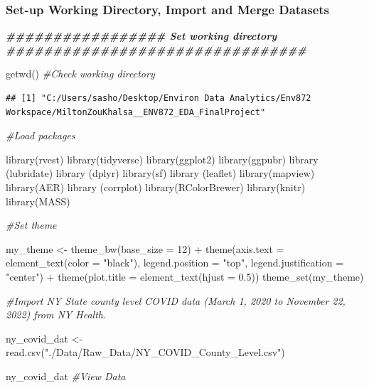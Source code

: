 \documentclass[
  12pt,
]{article}
\newenvironment{Shaded}{\begin{snugshade}}{\end{snugshade}}
\newcommand{\AttributeTok}[1]{\textcolor[rgb]{0.77,0.63,0.00}{#1}}
\newcommand{\CommentTok}[1]{\textcolor[rgb]{0.56,0.35,0.01}{\textit{#1}}}
\newcommand{\DecValTok}[1]{\textcolor[rgb]{0.00,0.00,0.81}{#1}}
\newcommand{\DocumentationTok}[1]{\textcolor[rgb]{0.56,0.35,0.01}{\textbf{\textit{#1}}}}
\newcommand{\FloatTok}[1]{\textcolor[rgb]{0.00,0.00,0.81}{#1}}
\newcommand{\FunctionTok}[1]{\textcolor[rgb]{0.00,0.00,0.00}{#1}}
\newcommand{\NormalTok}[1]{#1}
\newcommand{\OtherTok}[1]{\textcolor[rgb]{0.56,0.35,0.01}{#1}}
\newcommand{\SpecialCharTok}[1]{\textcolor[rgb]{0.00,0.00,0.00}{#1}}
\newcommand{\StringTok}[1]{\textcolor[rgb]{0.31,0.60,0.02}{#1}}
\begin{document}
\hypertarget{set-up-working-directory-import-and-merge-datasets}{%
\subsubsection{Set-up Working Directory, Import and Merge
Datasets}\label{set-up-working-directory-import-and-merge-datasets}}

\begin{Shaded}
\begin{Highlighting}[]
\DocumentationTok{\#\#\#\#\#\#\#\#\#\#\#\#\#\#\#\#\# Set working directory \#\#\#\#\#\#\#\#\#\#\#\#\#\#\#\#\#\#\#\#\#\#\#\#\#\#\#\#\#\#\#\#}

\FunctionTok{getwd}\NormalTok{() }\CommentTok{\#Check working directory}
\end{Highlighting}
\end{Shaded}

\begin{verbatim}
## [1] "C:/Users/sasho/Desktop/Environ Data Analytics/Env872 Workspace/MiltonZouKhalsa__ENV872_EDA_FinalProject"
\end{verbatim}

\begin{Shaded}
\begin{Highlighting}[]
\CommentTok{\#Load packages}

\FunctionTok{library}\NormalTok{(rvest)}
\FunctionTok{library}\NormalTok{(tidyverse)}
\FunctionTok{library}\NormalTok{(ggplot2)}
\FunctionTok{library}\NormalTok{(ggpubr)}
\FunctionTok{library}\NormalTok{ (lubridate)}
\FunctionTok{library}\NormalTok{ (dplyr)}
\FunctionTok{library}\NormalTok{(sf)}
\FunctionTok{library}\NormalTok{ (leaflet)}
\FunctionTok{library}\NormalTok{(mapview)}
\FunctionTok{library}\NormalTok{(AER)}
\FunctionTok{library}\NormalTok{ (corrplot)}
\FunctionTok{library}\NormalTok{(RColorBrewer)}
\FunctionTok{library}\NormalTok{(knitr)}
\FunctionTok{library}\NormalTok{(MASS)}

\CommentTok{\#Set theme}

\NormalTok{my\_theme }\OtherTok{\textless{}{-}} \FunctionTok{theme\_bw}\NormalTok{(}\AttributeTok{base\_size =} \DecValTok{12}\NormalTok{) }\SpecialCharTok{+} 
  \FunctionTok{theme}\NormalTok{(}\AttributeTok{axis.text =} \FunctionTok{element\_text}\NormalTok{(}\AttributeTok{color =} \StringTok{"black"}\NormalTok{), }
      \AttributeTok{legend.position =} \StringTok{"top"}\NormalTok{, }\AttributeTok{legend.justification =} \StringTok{"center"}\NormalTok{) }\SpecialCharTok{+}
  \FunctionTok{theme}\NormalTok{(}\AttributeTok{plot.title =} \FunctionTok{element\_text}\NormalTok{(}\AttributeTok{hjust =} \FloatTok{0.5}\NormalTok{))}
\FunctionTok{theme\_set}\NormalTok{(my\_theme)}


\CommentTok{\#Import NY State county level COVID data (March 1, 2020 to November 22, 2022) from NY Health.}

\NormalTok{ny\_covid\_dat }\OtherTok{\textless{}{-}} \FunctionTok{read.csv}\NormalTok{(}\StringTok{"./Data/Raw\_Data/NY\_COVID\_County\_Level.csv"}\NormalTok{)}

\NormalTok{ny\_covid\_dat }\CommentTok{\#View Data}
\end{Highlighting}
\end{Shaded}
\end{document}
